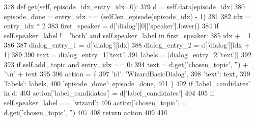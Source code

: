 \begin{DoxyCode}
378     \textcolor{keyword}{def }get(self, episode\_idx, entry\_idx=0):
379         d = self.data[episode\_idx]
380         episode\_done = entry\_idx == (self.len\_episode(episode\_idx) - 1)
381 
382         idx = entry\_idx * 2
383         first\_speaker = d[\textcolor{stringliteral}{'dialog'}][0][\textcolor{stringliteral}{'speaker'}].lower()
384         \textcolor{keywordflow}{if} self.speaker\_label != \textcolor{stringliteral}{'both'} \textcolor{keywordflow}{and} self.speaker\_label \textcolor{keywordflow}{in} first\_speaker:
385             idx += 1
386 
387         dialog\_entry\_1 = d[\textcolor{stringliteral}{'dialog'}][idx]
388         dialog\_entry\_2 = d[\textcolor{stringliteral}{'dialog'}][idx + 1]
389 
390         text = dialog\_entry\_1[\textcolor{stringliteral}{'text'}]
391         labels = [dialog\_entry\_2[\textcolor{stringliteral}{'text'}]]
392 
393         \textcolor{keywordflow}{if} self.add\_topic \textcolor{keywordflow}{and} entry\_idx == 0:
394             text = d.get(\textcolor{stringliteral}{'chosen\_topic'}, \textcolor{stringliteral}{''}) + \textcolor{stringliteral}{'\(\backslash\)n'} + text
395 
396         action = \{
397             \textcolor{stringliteral}{'id'}: \textcolor{stringliteral}{'WizardBasicDialog'},
398             \textcolor{stringliteral}{'text'}: text,
399             \textcolor{stringliteral}{'labels'}: labels,
400             \textcolor{stringliteral}{'episode\_done'}: episode\_done,
401         \}
402         \textcolor{keywordflow}{if} \textcolor{stringliteral}{'label\_candidates'} \textcolor{keywordflow}{in} d:
403             action[\textcolor{stringliteral}{'label\_candidates'}] = d[\textcolor{stringliteral}{'label\_candidates'}]
404 
405         \textcolor{keywordflow}{if} self.speaker\_label == \textcolor{stringliteral}{'wizard'}:
406             action[\textcolor{stringliteral}{'chosen\_topic'}] = d.get(\textcolor{stringliteral}{'chosen\_topic'}, \textcolor{stringliteral}{''})
407 
408         \textcolor{keywordflow}{return} action
409 
410 
\end{DoxyCode}
\mbox{\label{classparlai_1_1tasks_1_1wizard__of__wikipedia_1_1agents_1_1BasicdialogTeacher_a2557378cd9519f4596b2fcc713698056}} 
